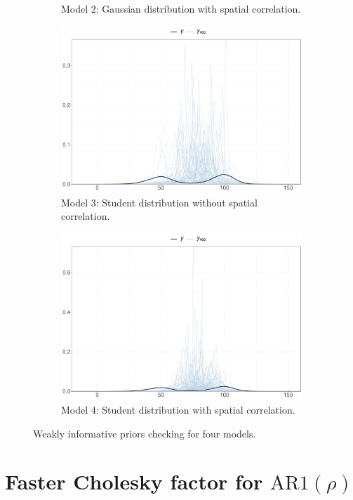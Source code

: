 \documentclass[a4paper]{article}   	%
\newcommand{\AR}{\mathrm{AR}1}
\begin{document}
\begin{figure}[!htp]
\begin{subfigure}[t]{0.45\textwidth}
			\caption{Model 2: Gaussian distribution with spatial correlation.}
		\end{subfigure}
		\begin{subfigure}[t]{0.45\textwidth}
			\includegraphics[width=\linewidth]{Images/prior_STRNS}
			\caption{Model 3: Student distribution without spatial correlation.}
		\end{subfigure}
		\begin{subfigure}[t]{0.45\textwidth}		
			\includegraphics[width=\linewidth]{Images/prior_STRand}
			\caption{Model 4: Student distribution with spatial correlation.}
		\end{subfigure}
		\caption{Weakly informative priors checking for four models. }\label{fig:priorcheck4models}
	\end{figure}
	
	
	\section{Faster Cholesky factor for $\AR(\rho)$}\label{sec:fastar1}
	
\end{document}
